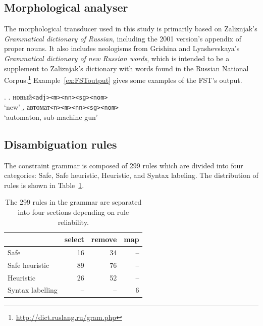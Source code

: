 \documentclass[11pt]{article}
\newcommand{\rus}[1]{\foreignlanguage{russian}{#1}}
\begin{document}
\subsection{Morphological analyser}
\label{sec:morph}

The morphological transducer used in this study is 
primarily based on Zaliznjak's \emph{Grammatical dictionary of Russian}, 
including the 2001 version's appendix of proper nouns. It also includes neologisms
from Grishina and Lyashevskaya's \emph{Grammatical dictionary of new Russian words},
which is intended to be a supplement to Zaliznjak's dictionary with words found in
the Russian National Corpus.\footnote{\url{http://dict.ruslang.ru/gram.php}} 
Example~\ref{ex:FSToutput} gives some examples of the FST's output.

\ex. \label{ex:FSToutput} 
	\a. \rus{новый}\texttt{{\small <adj><m><nn><sg><nom>}}\\
	    `new'
	\b. \rus{автомат}\texttt{{<m><nn><sg><nom>}}\\
	    `automaton, sub-machine gun'

\subsection{Disambiguation rules}

The constraint grammar is composed of 299 rules which are divided into four
categories: Safe, Safe heuristic, Heuristic, and Syntax labeling. The distribution
of rules is shown in Table~\ref{tab:ruleDist}.

\begin{table}[hb]
  \centering
  \begin{tabular}{lrrr}
    \hline
                     & {\sc select} & {\sc remove} & {\sc map} \\
    \hline
    Safe             &   16         &   34         &  -- \\
    Safe heuristic   &   89         &   76         &  -- \\
    Heuristic        &   26         &   52         &  -- \\
    Syntax labelling & --           & --           & 6 \\ 
    \hline
  \end{tabular}
  \caption{The 299 rules in the grammar are separated into four sections depending
      on rule reliability. }
  \label{tab:ruleDist}
\end{table}
\end{document}
